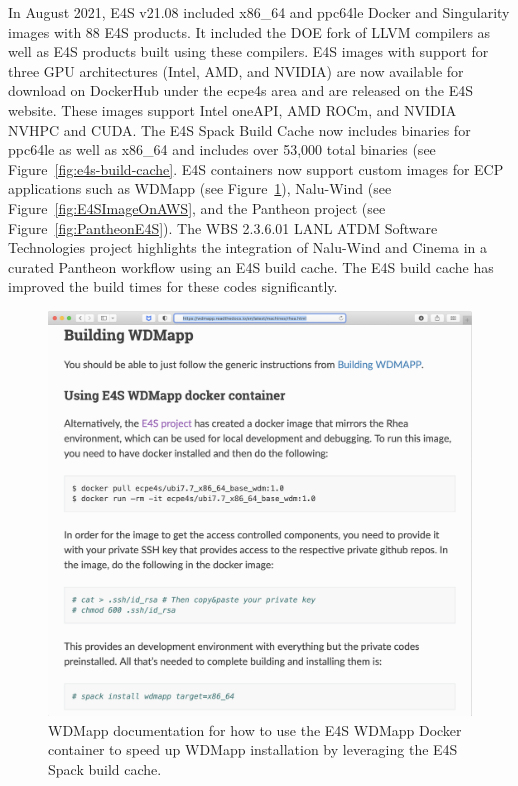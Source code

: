 In August 2021, E4S v21.08 included x86\_64 and ppc64le Docker and Singularity images with 88 E4S products. It included the DOE fork of LLVM compilers as well as E4S products built using these compilers. E4S images with support for three GPU architectures (Intel, AMD, and NVIDIA) are now available for download on DockerHub under the ecpe4s area and are released on the E4S website. These images support Intel oneAPI, AMD ROCm, and NVIDIA NVHPC and CUDA. The E4S Spack Build Cache now includes binaries for ppc64le as well as x86\_64 and includes over 53,000 total binaries (see Figure~\ref{fig:e4s-build-cache}. E4S containers now support custom images for ECP applications such as WDMapp (see Figure~\ref{fig:SpackBuildCacheWDMapp}), Nalu-Wind (see Figure~\ref{fig:E4SImageOnAWS}, and the Pantheon project (see Figure~\ref{fig:PantheonE4S}). The WBS 2.3.6.01 LANL ATDM Software Technologies project highlights the integration of Nalu-Wind and Cinema in a curated Pantheon workflow using an E4S build cache. The E4S build cache has improved the build times for these codes significantly. 
\begin{figure}
        \centering
        \includegraphics[width=0.82\linewidth]{projects/2.3.5-Ecosystem/2.3.5.01-Ecosystem-SDK/E4S_WDMApp}
        \caption{WDMapp documentation for how to use the E4S WDMapp Docker container to speed up WDMapp installation by leveraging the E4S Spack build cache.}
        \label{fig:SpackBuildCacheWDMapp}
\end{figure}


